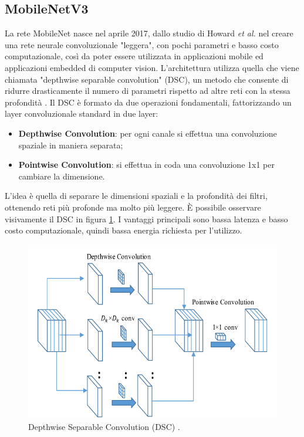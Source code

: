 \documentclass[11pt]{report}
\begin{document}
\subsection{MobileNetV3}

La rete MobileNet nasce nel aprile 2017, dallo studio di Howard \textit{et al.} \cite{mobilenet2017} nel creare una rete neurale convoluzionale "leggera", con pochi parametri e basso costo computazionale, così da poter essere utilizzata in applicazioni mobile ed applicazioni embedded di computer vision.  L'architettura utilizza quella che viene chiamata "depthwise separable convolution" (DSC), un metodo che consente di ridurre drasticamente il numero di parametri rispetto ad altre reti con la stessa profondità  \cite{pujara_2020}. Il DSC è formato da due operazioni fondamentali, fattorizzando un layer convoluzionale standard in due layer:
\begin{itemize}
    \item \textbf{Depthwise Convolution}: per ogni canale si effettua una convoluzione spaziale in maniera separata;
    \item \textbf{Pointwise Convolution}: si effettua in coda una convoluzione 1x1 per cambiare la dimensione.
\end{itemize}

L'idea è quella di separare le dimensioni spaziali e la profondità dei filtri, ottenendo reti più profonde ma molto più leggere. È possibile osservare visivamente il DSC in figura \ref{fig:DSC}. I vantaggi principali sono bassa latenza e basso costo computazionale, quindi bassa energia richiesta per l'utilizzo.


\begin{figure}
    \centering
    \includegraphics[scale=0.45]{img/Depthwise-separable-convolution-block.png}
    \caption{Depthwise Separable Convolution (DSC) \cite{dsc}.}
    \label{fig:DSC}
\end{figure}
\end{document}

